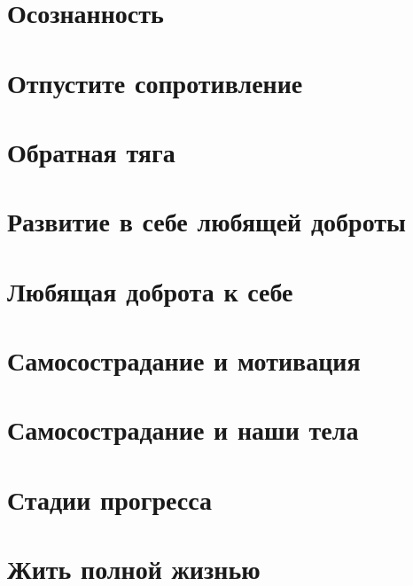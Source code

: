 \documentclass[a4paper,12pt]{report}
\begin{document}



\tableofcontents










\chapter{Осознанность}
\chapter{Отпустите сопротивление}
\chapter{Обратная тяга} \label{Backdraft}
\chapter{Развитие в себе любящей доброты}
\chapter{Любящая доброта к себе}
\chapter{Самосострадание и мотивация} \label{Self-Compassionate_Motivation}
\chapter{Самосострадание и наши тела}
\chapter{Стадии прогресса}
\chapter{Жить полной жизнью}
\end{document}
